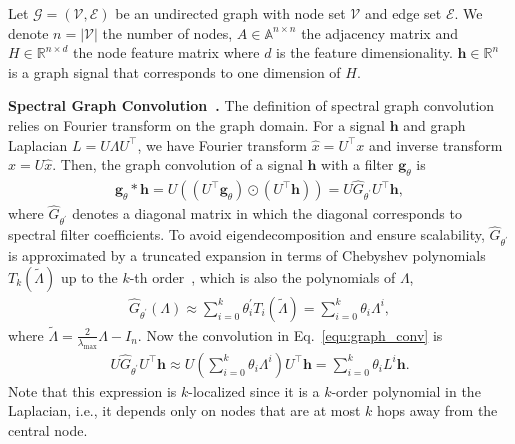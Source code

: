 \documentclass[nohyperref]{article}
\theoremstyle{plain}
\theoremstyle{definition}
\theoremstyle{remark}
\begin{document}
Let $\mathcal G=(\mathcal V, \mathcal E)$ be an undirected graph with node set $\mathcal V$ and edge set $\mathcal E$.
We denote $n = |\mathcal V|$ the number of nodes, $A\in\mathbb A^{n\times n}$ the adjacency matrix and $H\in\mathbb R^{n\times d}$ the node feature matrix where $d$ is the feature dimensionality.
$\bm h\in\mathbb R^n$ is a graph signal that corresponds to one dimension of $H$.

\textbf{Spectral Graph Convolution~\cite{hammond2011wavelets,defferrard2016convolutional}.}
The definition of spectral graph convolution relies on Fourier transform on the graph domain.
For a signal $\bm h$ and graph Laplacian $L=U\Lambda U^{\top}$, we have Fourier transform $\hat x=U^{\top}x$ and inverse transform $x=U\hat x$.
Then, the graph convolution of a signal $\bm h$ with a filter $\bm g_{\theta}$ is
\begin{equation}
	\label{equ:graph_conv}
	\begin{aligned}
		\bm g_{\theta}*\bm h=U\left(\left(U^{\top}\bm g_{\theta}\right)\odot\left(U^{\top}\bm h\right)\right)=U\hat{G}_{\theta^{\prime}}U^{\top}\bm h,
	\end{aligned}
\end{equation}
where $\hat{G}_{\theta^{\prime}}$ denotes a diagonal matrix in which the diagonal corresponds to spectral filter coefficients.
To avoid eigendecomposition and ensure scalability, $\hat{G}_{\theta^{\prime}}$ is approximated by a truncated expansion in terms of Chebyshev polynomials $T_k(\tilde{\Lambda})$ up to the $k$-th order~\cite{hammond2011wavelets}, which is also the polynomials of $\Lambda$,
\begin{equation}
	\label{equ:poly_filter}
	\begin{aligned}
		\hat{G}_{\theta^{\prime}}(\Lambda)\approx\sum_{i=0}^{k} \theta_i^{\prime} T_i(\tilde{\Lambda})=\sum_{i=0}^{k}\theta_{i}\Lambda^{i},
	\end{aligned}
\end{equation}
where $\tilde{\Lambda}=\frac{2}{\lambda_{\max}}\Lambda-I_n$.
Now the convolution in Eq.~\ref{equ:graph_conv} is
\begin{equation}
	\label{equ:poly_conv}
	\begin{aligned}
		U\hat{G}_{\theta^{\prime}}U^{\top}\bm h\approx U\left(\sum_{i=0}^{k}\theta_{i}\Lambda^{i}\right)U^{\top}\bm h=\sum_{i=0}^{k}\theta_{i}L^{i}\bm h.
	\end{aligned}
\end{equation}
Note that this expression is $k$-localized since it is a $k$-order polynomial in the Laplacian, i.e., it depends only on nodes that are at most $k$ hops away from the central node.
\end{document}
